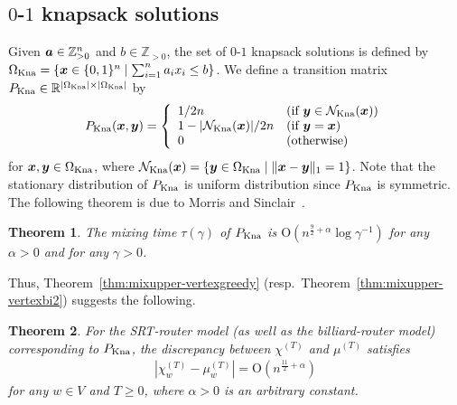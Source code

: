 \documentclass[letter, 11pt]{article}
\newcommand{\Order}{\mathrm{O}}
\renewcommand{\Vec}[1]{\mbox{\boldmath $#1$}}
\newcommand{\1}{\mbox{1}\hspace{-0.25em}\mbox{l}}
\newtheorem{theorem}{Theorem}[section]
\begin{document}
\subsection{$0$-$1$ knapsack solutions}\label{sec:knapsack}
Given $\Vec{a} \in \mathbb{Z}_{> 0}^n$ and $b\in \mathbb{Z}_{> 0}$, 
  the set of  $0$-$1$ knapsack solutions is defined by 
  $\Omega_{\rm Kna}=\{\Vec x \in \{0, 1\}^n \mid \sum_{i=1}^{n}a_i x_i\leq b\}$. 
 We define a transition matrix 
   $P_{\rm Kna} \in \mathbb{R}^{|\Omega_{\rm Kna}| \times |\Omega_{\rm Kna}|}$ 
  by
\begin{align}
\label{eq:knapsackP}
P_{\rm Kna}(\Vec x, \Vec y) = \left\{
\begin{array}{ll}
1/2n & (\mbox{if } \Vec y \in {\cal N}_{\rm Kna}(\Vec x))\\
1-|{\cal N}_{\rm Kna}(\Vec x)|/2n & (\mbox{if } \Vec y=\Vec x)\\
0 & (\mbox{otherwise})
\end{array}
\right. 
\end{align}
for $\Vec x, \Vec y\in \Omega_{\rm Kna}$, where ${\cal N}_{\rm Kna}(\Vec x)=\{\Vec y\in \Omega_{\rm Kna}\mid \|\Vec x-\Vec y\|_{1}=1\}$. 
Note that the stationary distribution of $P_{\rm Kna}$ is uniform distribution since $P_{\rm Kna}$ is symmetric. 
The following theorem is due to Morris and Sinclair~\cite{MS04}. 
\begin{theorem}
\label{thm:knapsackmix}
\cite{MS04}
 The mixing time $\tau(\gamma)$ of $P_{\rm Kna}$ is 
$\Order ( n^{\frac{9}{2}+\alpha}\log \gamma^{-1} )$
for any $\alpha>0$ and for any $\gamma>0$. 
\end{theorem}



 Thus, Theorem~\ref{thm:mixupper-vertexgreedy} (resp.\ Theorem~\ref{thm:mixupper-vertexbi2}) suggests the following. 
\begin{theorem}\label{thm:knapsackupper}
For the SRT-router model (as well as the billiard-router model) corresponding to $P_{\rm Kna}$, 
 the discrepancy between $\chi^{(T)}$ and $\mu^{(T)}$ satisfies
\begin{eqnarray*}
\left|\chi_w^{(T)}-\mu_w^{(T)}\right| = \Order ( n^{\frac{11}{2}+\alpha})
\end{eqnarray*}
for any $w\in V$ and $T\geq 0$, where $\alpha>0$ is an arbitrary constant. 
\end{theorem}
\end{document}
